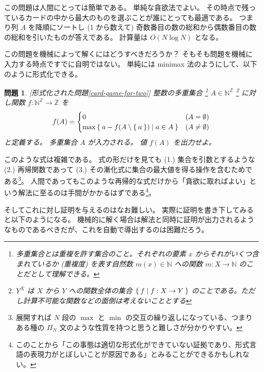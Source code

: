 \documentclass{ltjsarticle}
\newtheorem{problem*}{問題}[section]
\newenvironment{problem}{\begin{problem*}\renewcommand{\qedsymbol}{\(\diamond\)}\pushQED{\qed}}{\popQED\end{problem*}}
\begin{document}
この問題は人間にとっては簡単である。
単純な貪欲法でよい。
その時点で残っているカードの中から最大のものを選ぶことが誰にとっても最適である。
つまり列 $A$ を降順にソートし ($1$ から数えて) 奇数番目の数の総和から偶数番目の数の総和を引いたものが答えである。
計算量は $O(N \log N)$ となる。

この問題を機械によって解くにはどうすべきだろうか？
そもそも問題を機械に入力する時点ですでに自明ではない。
単純には minimax 法のようにして、以下のように形式化できる。

\begin{problem}[形式化された問題\ref{card-game-for-two}]
    \label{card-game-for-two-formal}
    整数の多重集合 \footnote{多重集合とは重複を許す集合のこと。それぞれの要素 $x$ からそれがいくつ含まれているか (重複度) を表す自然数 $m(x) \in \mathbb{N}$ への関数 $m : X \to \mathbb{N}$ のことだとして理解できる。} $A \in \mathbb{N}^\mathbb{Z}$ \footnote{$Y^X$ は $X$ から $Y$ への関数全体の集合 $\Set{ f | f : X \to Y }$ のことである。ただし計算不可能な関数などの面倒は考えないこととする} に対し関数 $f : \mathbb{N}^\mathbb{Z} \to \mathbb{Z}$ を
    \[
        f(A) = \begin{cases}
            0 & (A = \emptyset) \\
            \max \Set{ a - f(A \setminus \Set{ a }) | a \in A } & (A \ne \emptyset)
        \end{cases}
    \]
    と定義する。
    多重集合 $A$ が入力される。
    値 $f(A)$ を出力せよ。
\end{problem}

このような式は複雑である。
式の形だけを見ても (1.) 集合を引数とするような (2.) 再帰関数であって (3.) その漸化式に集合の最大値を得る操作を含むためである\footnote{展開すれば $N$ 段の $\max$ と $\min$ の交互の繰り返しになっている、つまりある種の $\Pi_N$ 文のような性質を持つと思うと難しさが分かりやすい。}。
人間であってもこのような再帰的な式だけから「貪欲に取ればよい」という解法に至るのは手間がかかるはずである\footnote{このことから「この事態は適切な形式化ができていない証拠であり、形式言語の表現力がとぼしいことが原因である」とみることができるかもしれない。}。

そしてこれに対し証明を与えるのはなお難しい。
実際に証明を書き下してみると以下のようになる。
機械的に解く場合は解法と同時に証明が出力されるようなものであるべきだが、これを自動で導出するのは困難だろう。
\end{document}
